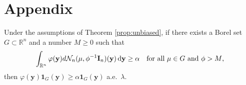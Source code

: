 \documentclass[smallextended]{svjour3}       %
\newcommand{\By}{\mathbf{y}}    \newcommand{\Bz}{\mathbf{z}}
\begin{document}
\appendix
\section*{Appendix}

\begin{lemma}\label{Lemma:FF}
    Under the assumptions of Theorem \ref{prop:unbiased}, if there exists a Borel set $G\subset \mathbb R^n$ and a number $M\geq 0$ such that 
    \begin{equation*}
        \int_{\mathbb R^n} \varphi(\By) d\mathcal N_n(\mu,\phi^{-1} \BI_n)(\By)\, \mathrm{d} \By \geq \alpha\quad \text{for all $\mu \in G$ and $\phi >M$},
    \end{equation*}
    then $\varphi(\By)\mathbf 1_{G}(\By)\geq \alpha \mathbf 1_{G}(\By)$ a.e.\ $\lambda$.
\end{lemma}
\end{document}
